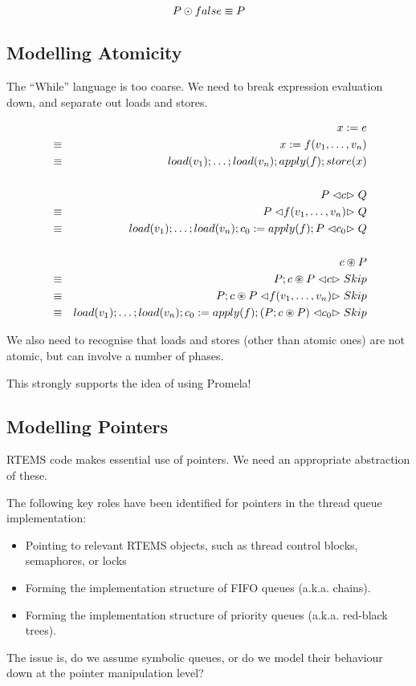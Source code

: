 $$ P \odot false \equiv P$$


\newpage
\subsection{Modelling Atomicity}

The ``While'' language is too coarse.
We need to break expression evaluation down, and separate out loads and stores.

\begin{eqnarray*}
   && x:=e
\\ &\equiv& x := f(v_1,\dots,v_n)
\\ &\equiv& load(v_1);\dots;load(v_n);apply(f);store(x)
\\
\\ && P \mathrel{\lhd {c} \rhd} Q
\\ &\equiv& P \mathrel{\lhd {f(v_1,\dots,v_n)} \rhd} Q
\\ &\equiv& load(v_1);\dots;load(v_n);c_0:=apply(f);P \mathrel{\lhd {c_0} \rhd} Q
\\
\\ && c \circledast P
\\ &\equiv& P; c \circledast P \mathrel{\lhd {c} \rhd} Skip
\\ &\equiv& P; c \circledast P \mathrel{\lhd {f(v_1,\dots,v_n)} \rhd} Skip
\\ &\equiv& load(v_1);\dots;load(v_n);c_0:=apply(f);(P; c \circledast P) \mathrel{\lhd {c_0} \rhd} Skip
\end{eqnarray*}

We also need to recognise that loads and stores
(other than atomic ones)
are not atomic, but can involve a number of phases.

This strongly supports the idea of using Promela!

\newpage
\subsection{Modelling Pointers}

RTEMS code makes essential use of pointers.
We need an appropriate abstraction of these.

The following key roles have been identified for pointers
in the thread queue implementation:
\begin{itemize}
  \item
    Pointing to relevant RTEMS objects,
    such as thread control blocks, semaphores, or locks
  \item
    Forming the implementation structure of FIFO queues
    (a.k.a. chains).
  \item
    Forming the implementation structure of priority queues
    (a.k.a. red-black trees).
\end{itemize}
The issue is,
do we assume symbolic queues,
or do we model their behaviour down at the pointer manipulation level?

